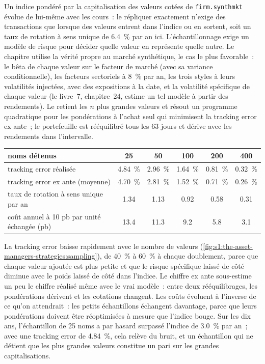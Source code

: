 Un indice pondéré par la capitalisation des valeurs cotées de \texttt{firm.synthmkt} évolue de lui-même avec les cours~: le répliquer exactement n'exige des transactions que lorsque des valeurs entrent dans l'indice ou
en sortent, soit un taux de rotation à sens unique de 6.4~\% par an ici. L'échantillonnage exige un modèle de risque pour décider quelle valeur en représente quelle autre. Le chapitre utilise la
vérité propre au marché synthétique, le cas le plus favorable~: le bêta de chaque valeur sur le facteur de marché (avec sa variance conditionnelle), les facteurs sectoriels à 8~\% par an, les trois
styles à leurs volatilités injectées, avec des expositions à la date, et la volatilité spécifique de chaque valeur (le livre~7, chapitre~24, estime un tel modèle à partir des
rendements). Le  retient les $n$ plus grandes valeurs et résout un programme quadratique pour les pondérations à l'achat seul
qui minimisent la tracking error ex ante~; le portefeuille est rééquilibré tous les 63 jours et dérive avec les rendements dans l'intervalle.

\begin{center}
\small
\begin{tabular}{@{}lccccc@{}}
\toprule
noms détenus & 25 & 50 & 100 & 200 & 400\\
\midrule
tracking error réalisée & 4.84~\% & 2.96~\% & 1.64~\% & 0.81~\% & 0.32~\%\\
tracking error ex ante (moyenne) & 4.70~\% & 2.81~\% & 1.52~\% & 0.71~\% & 0.26~\%\\
taux de rotation à sens unique par an & 1.34 & 1.13 & 0.92 & 0.58 & 0.31\\
coût annuel à 10 pb par unité échangée (pb) & 13.4 & 11.3 & 9.2 & 5.8 & 3.1\\
\bottomrule
\end{tabular}
\end{center}

La tracking error baisse rapidement avec le nombre de valeurs (\cref{fig:s1:the-asset-managers-strategies:sampling}), de 40~\% à 60~\% à chaque doublement, parce que
chaque valeur ajoutée est plus petite et que le risque spécifique laissé de côté diminue avec le poids laissé de côté dans l'indice. Le chiffre ex ante sous-estime un peu le chiffre réalisé
même avec le vrai modèle~: entre deux rééquilibrages, les pondérations dérivent et les cotations changent. Les coûts évoluent à l'inverse de ce qu'on attendrait~: les petits échantillons
échangent davantage, parce que leurs pondérations doivent être réoptimisées à mesure que l'indice bouge. Sur les dix ans, l'échantillon de 25 noms a par hasard surpassé l'indice de 3.0~\% par
an~; avec une tracking error de 4.84~\%, cela relève du bruit, et un échantillon qui ne détient que les plus grandes valeurs constitue un pari sur les grandes capitalisations.

